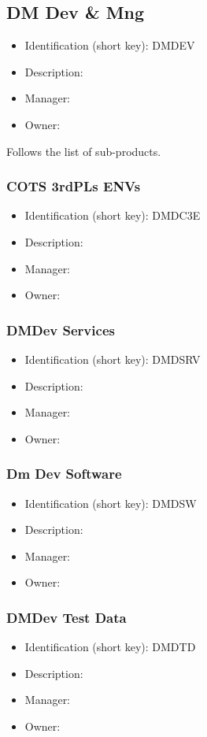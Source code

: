 \subsection{DM Dev \&  Mng}\label{sect:DMDEV}
\begin{itemize}
\item Identification (short key): DMDEV
\item Description: 
\item Manager: 
\item Owner: 
\end{itemize}

Follows the list of sub-products.\subsubsection{COTS 3rdPLs ENVs}\label{sect:DMDC3E}
\begin{itemize}
\item Identification (short key): DMDC3E
\item Description: 
\item Manager: 
\item Owner: 
\end{itemize}

\subsubsection{DMDev Services}\label{sect:DMDSRV}
\begin{itemize}
\item Identification (short key): DMDSRV
\item Description: 
\item Manager: 
\item Owner: 
\end{itemize}

\subsubsection{Dm Dev Software}\label{sect:DMDSW}
\begin{itemize}
\item Identification (short key): DMDSW
\item Description: 
\item Manager: 
\item Owner: 
\end{itemize}

\subsubsection{DMDev Test Data}\label{sect:DMDTD}
\begin{itemize}
\item Identification (short key): DMDTD
\item Description: 
\item Manager: 
\item Owner: 
\end{itemize}

